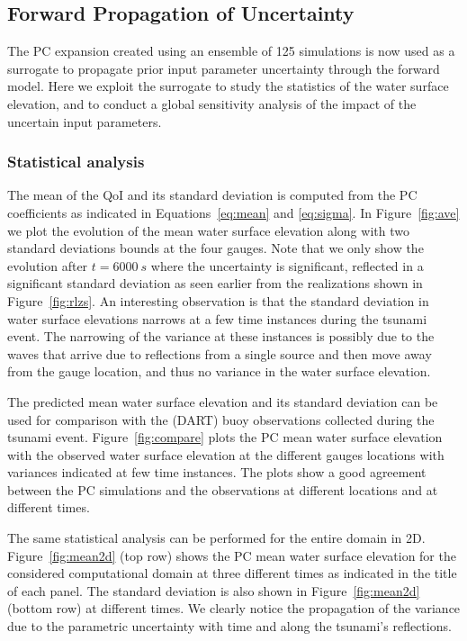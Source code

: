 \subsection{Forward Propagation of Uncertainty}
\label{sec:forward}
The PC expansion created using an ensemble of 125 \geoclaw simulations
is now used as a surrogate to propagate prior input parameter uncertainty 
through the forward model.  Here we exploit the surrogate 
to study the statistics of the water surface elevation, and to conduct 
a global sensitivity analysis of the impact of the uncertain input parameters.

\subsubsection{Statistical analysis}
The mean of the QoI and its standard deviation is computed
from the PC coefficients as indicated in Equations~\eqref{eq:mean} and \eqref{eq:sigma}. 
In Figure~\ref{fig:ave} we plot the evolution of
the mean water surface elevation along with two standard deviations
bounds at the four gauges.  
Note that we only show the evolution after $t=6000~s$ where the uncertainty is significant,
reflected in a significant standard deviation as seen earlier from the realizations shown 
in Figure~\ref{fig:rlzs}. An interesting observation is that the
standard deviation in water surface elevations narrows at a few time instances
during the tsunami event.  The narrowing of the variance at these instances is
possibly due to the waves that arrive due to reflections from a single source
and then move away from the gauge location, and thus no variance in the water
surface elevation.


The predicted mean water surface elevation  and its standard deviation 
can be used for comparison with the (DART) buoy observations collected during
the tsunami event. Figure~\ref{fig:compare} 
plots the PC mean water surface elevation with the observed 
water surface elevation at the different gauges locations
with variances indicated at few time instances. 
The plots show a good agreement between the PC simulations and the 
observations at different locations and at different times. 

The same statistical analysis can be performed for the
entire domain in 2D. Figure~\ref{fig:mean2d} (top row) shows
the PC mean water surface elevation for the considered computational
domain at three different times as indicated in the title of each panel.
The standard deviation is also shown in Figure~\ref{fig:mean2d} (bottom row)
at different times. We clearly notice the propagation of the variance
due to the parametric uncertainty with time
and along the tsunami's reflections. 

